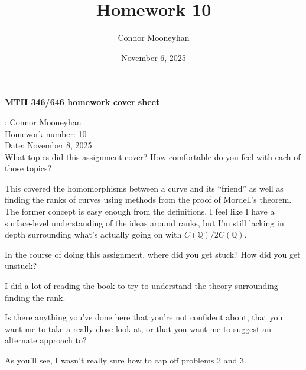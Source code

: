 \documentclass[12pt]{article}
\title{Homework 10}
\author{Connor Mooneyhan}
\date{November 6, 2025}
\theoremstyle{definition}
\begin{document}
\begin{center}
	{\bf\Large MTH 346/646 homework cover sheet}
\end{center}

\vspace{0.5in}

: Connor Mooneyhan \\
{\large Homework number}: 10 \\
{\large Date}: November 8, 2025 \\

{\Large What topics did this assignment cover? How comfortable do you feel with
each of those topics?}

This covered the homomorphisms between a curve and its ``friend'' as well as finding the ranks of curves using methods from the proof of Mordell's theorem.
The former concept is easy enough from the definitions.
I feel like I have a surface-level understanding of the ideas around ranks, but I'm still lacking in depth surrounding what's actually going on with $C(\mathbb{Q})/2C(\mathbb{Q})$.

\vspace{1.75in}

{\Large In the course of doing this assignment, where did you get stuck?
	How did you get unstuck?}

I did a lot of reading the book to try to understand the theory surrounding finding the rank.

\vspace{1.75in}

{\Large Is there anything you've done here that you're not confident about, that you want me to take a really close look at, or that you want me to suggest an alternate approach to?}

As you'll see, I wasn't really sure how to cap off problems 2 and 3.

\pagebreak
\end{document}
